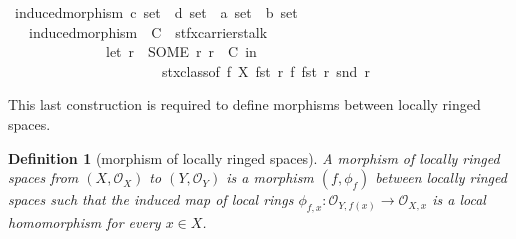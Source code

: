 \documentclass[12pt]{scrartcl}
\newtheorem{definition}[proposition]{Definition}
\begin{document}
\begin{isabelle}
\isanewline
\isanewline
{}\isamarkupfalse%
\ induced{\isacharunderscore}{\kern0pt}morphism{\isacharcolon}{\kern0pt}{\isacharcolon}{\kern0pt}\ {\isachardoublequoteopen}{\isacharparenleft}{\kern0pt}{\isacharprime}{\kern0pt}c\ set\ {\isasymtimes}\ {\isacharprime}{\kern0pt}d{\isacharparenright}{\kern0pt}\ set\ {\isasymRightarrow}\ {\isacharparenleft}{\kern0pt}{\isacharprime}{\kern0pt}a\ set\ {\isasymtimes}\ {\isacharprime}{\kern0pt}b{\isacharparenright}{\kern0pt}\ set{\isachardoublequoteclose}\ \isanewline
\ \ \ {\isachardoublequoteopen}induced{\isacharunderscore}{\kern0pt}morphism\ {\isasymequiv}\ {\isasymlambda}C\ {\isasymin}\ stfx{\isachardot}{\kern0pt}carrier{\isacharunderscore}{\kern0pt}stalk{\isachardot}{\kern0pt}\ \ \isanewline
\ \ \ \ \ \ \ \ \ \ \ \ \ \ let\ r\ {\isacharequal}{\kern0pt}\ {\isacharparenleft}{\kern0pt}SOME\ r{\isachardot}{\kern0pt}\ r\ {\isasymin}\ C{\isacharparenright}{\kern0pt}\ in\ \isanewline
\ \ \ \ \ \ \ \ \ \ \ \ \ \ \ \ \ \ \ \ \ \ stx{\isachardot}{\kern0pt}class{\isacharunderscore}{\kern0pt}of\ {\isacharparenleft}{\kern0pt}f\isactrlsup {\isasyminverse}\ X\ {\isacharparenleft}{\kern0pt}fst\ r{\isacharparenright}{\kern0pt}{\isacharparenright}{\kern0pt}\ {\isacharparenleft}{\kern0pt}{\isasymphi}\isactrlsub f\ {\isacharparenleft}{\kern0pt}fst\ r{\isacharparenright}{\kern0pt}\ {\isacharparenleft}{\kern0pt}snd\ r{\isacharparenright}{\kern0pt}{\isacharparenright}{\kern0pt}{\isachardoublequoteclose}\isanewline
\isanewline
{}
\end{isabelle}


This last construction is required to define morphisms between locally ringed spaces.
			
\begin{definition}[morphism of locally ringed spaces]
	A morphism of locally ringed spaces from $(X, \mathscr{O}_X)$ to $(Y, \mathscr{O}_Y)$ is a morphism $(f, \phi_f)$ between locally ringed spaces such that the induced map of local rings $\phi_{f, x}: \mathscr{O}_{Y, f(x)} \rightarrow \mathscr{O}_{X, x}$ is a local homomorphism for every $x \in X$.  
\end{definition}
\end{document}
